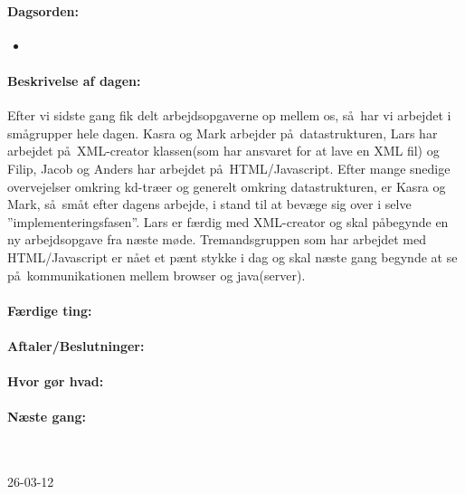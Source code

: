 \documentclass[a4paper,10pt,titlepage]{article}
\begin{document}
		\paragraph{Dagsorden:}
		\begin{itemize}
					\item 
					
		\end{itemize}
		
		\paragraph{Beskrivelse af dagen:}
		Efter vi sidste gang fik delt arbejdsopgaverne op mellem os, s\aa \ har vi arbejdet i sm\aa grupper hele dagen. 
Kasra og Mark arbejder p\aa \ datastrukturen, Lars har arbejdet p\aa \ XML-creator klassen(som har ansvaret for at lave en XML fil) og Filip, Jacob og Anders har arbejdet p\aa \ HTML/Javascript.
Efter mange snedige overvejelser omkring kd-tr\ae er og generelt omkring datastrukturen, er Kasra og Mark, s\aa \ sm\aa t efter dagens arbejde,  i stand til at bev\ae ge sig over i selve ”implementeringsfasen”.  Lars er f\ae rdig med XML-creator og skal p\aa begynde en ny arbejdsopgave fra n\ae ste m\o de. Tremandsgruppen som har arbejdet med HTML/Javascript er n\aa et et p\ae nt stykke i dag og skal n\ae ste gang begynde at se p\aa \ kommunikationen mellem browser og java(server).

		\paragraph{F\ae rdige ting:}
		
		\paragraph{Aftaler/Beslutninger:}
		
		\paragraph{Hvor g\o r hvad:}
		
		\paragraph{N\ae ste gang:}\mbox{}\\
		
		\begin{center}
		26-03-12
		\end{center}
		
\end{document}

